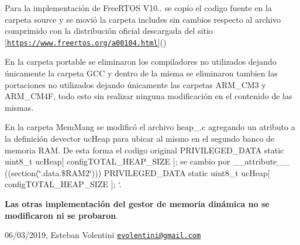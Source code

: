 Para la implementación de Free\+R\+T\+OS V10.. se copío el codigo fuente en la carpeta {\ttfamily source} y se movió la carpeta {\ttfamily includes} sin cambios respecto al archivo comprimido con la distribución oficial descargada del sitio \mbox{[}\href{https://www.freertos.org/a00104.html}{\tt https\+://www.\+freertos.\+org/a00104.\+html}\mbox{]}()

En la carpeta {\ttfamily portable} se eliminaron los compiladores no utilizados dejando únicamente la carpeta {\ttfamily G\+CC} y dentro de la misma se eliminaron tambien las portaciones no utilizados dejando únicamente las carpetas {\ttfamily A\+R\+M\+\_\+\+C\+M3} y {\ttfamily A\+R\+M\+\_\+\+C\+M4F}, todo esto sin realizar ninguna modificación en el contenido de las mismas.

En la carpeta {\ttfamily Mem\+Mang} se modificó el archivo {\ttfamily heap\+\_.\+c} agregando un atributo a la definición devector uc\+Heap para ubicar al mismo en el segundo banco de memoria R\+AM. De esta forma el codigo original {\ttfamily P\+R\+I\+V\+I\+L\+E\+G\+E\+D\+\_\+\+D\+A\+TA static uint8\+\_\+t uc\+Heap\mbox{[} config\+T\+O\+T\+A\+L\+\_\+\+H\+E\+A\+P\+\_\+\+S\+I\+ZE \mbox{]};} se cambio por {\ttfamily \+\_\+\+\_\+attribute\+\_\+\+\_\+ ((section(\char`\"{}.\+data.\$\+R\+A\+M2\char`\"{}))) P\+R\+I\+V\+I\+L\+E\+G\+E\+D\+\_\+\+D\+A\+TA static uint8\+\_\+t uc\+Heap\mbox{[} config\+T\+O\+T\+A\+L\+\_\+\+H\+E\+A\+P\+\_\+\+S\+I\+ZE \mbox{]}}; `.

{\bfseries Las otras implementación del gestor de memoria dinámica no se modificaron ni se probaron}.

06/03/2019, Esteban Volentini \href{mailto:evolentini@gmail.com}{\tt evolentini@gmail.\+com} 